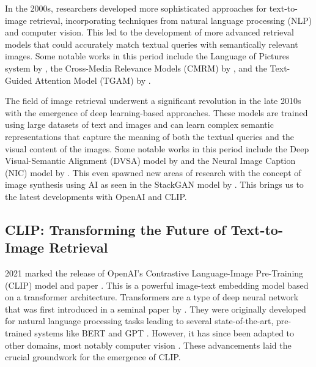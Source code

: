 \documentclass{l4proj}
\begin{document}
In the 2000s, researchers developed more sophisticated approaches for text-to-image retrieval, incorporating techniques from natural language processing (NLP) and computer vision. This led to the development of more advanced retrieval models that could accurately match textual queries with semantically relevant images. Some notable works in this period include the Language of Pictures system by \cite{lavrenko2003lop}, the Cross-Media Relevance Models (CMRM) by \cite{rasiwasia2010cmmr}, and the Text-Guided Attention Model (TGAM) by \cite{gao2018tgam}.

The field of image retrieval underwent a significant revolution in the late 2010s with the emergence of deep learning-based approaches. These models are trained using large datasets of text and images and can learn complex semantic representations that capture the meaning of both the textual queries and the visual content of the images. Some notable works in this period include the Deep Visual-Semantic Alignment (DVSA) model by \cite{karpathy2015dvsa} and the Neural Image Caption (NIC) model by \cite{vinyals2015nic}. This even spawned new areas of research with the concept of image synthesis using AI as seen in the StackGAN model by \cite{zhang2017stackgan}. This brings us to the latest developments with OpenAI and CLIP.


\subsection{CLIP: Transforming the Future of Text-to-Image Retrieval}
\label{sec:background_clip}
2021 marked the release of OpenAI's Contrastive Language-Image Pre-Training (CLIP) model and paper \citep{radford2021clip}. This is a powerful image-text embedding model based on a transformer architecture. Transformers are a type of deep neural network that was first introduced in a seminal paper by \cite{vaswani2017attention}. They were originally developed for natural language processing tasks leading to several state-of-the-art, pre-trained systems like BERT \citep{devlin2018bert} and GPT \citep{radford2018gpt}. However, it has since been adapted to other domains, most notably computer vision \citep{dosovitskiy2020vit}. These advancements laid the crucial groundwork for the emergence of CLIP.
\end{document}
